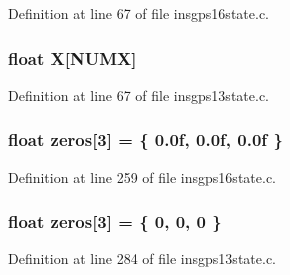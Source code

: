 Definition at line 67 of file insgps16state.\-c.

\hypertarget{group___i_n_s_g_p_s_ga878335db1805364cefebddb5eccfc282}{
\subsubsection[{X}]{\setlength{\rightskip}{0pt plus 5cm}float X\mbox{[}N\-U\-M\-X\mbox{]}}}\label{group___i_n_s_g_p_s_ga878335db1805364cefebddb5eccfc282}


Definition at line 67 of file insgps13state.\-c.

\hypertarget{group___i_n_s_g_p_s_ga37df636c79e0bd4b3fab83292679a4b0}{
\subsubsection[{zeros}]{\setlength{\rightskip}{0pt plus 5cm}float zeros\mbox{[}3\mbox{]} = \{ 0.\-0f, 0.\-0f, 0.\-0f \}}}\label{group___i_n_s_g_p_s_ga37df636c79e0bd4b3fab83292679a4b0}


Definition at line 259 of file insgps16state.\-c.

\hypertarget{group___i_n_s_g_p_s_ga37df636c79e0bd4b3fab83292679a4b0}{
\subsubsection[{zeros}]{\setlength{\rightskip}{0pt plus 5cm}float zeros\mbox{[}3\mbox{]} = \{ 0, 0, 0 \}}}\label{group___i_n_s_g_p_s_ga37df636c79e0bd4b3fab83292679a4b0}


Definition at line 284 of file insgps13state.\-c.

